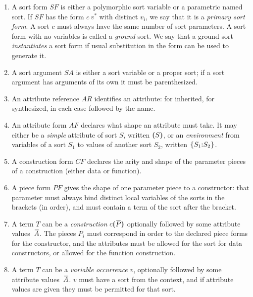 \documentclass[11pt]{article} %
\begin{document}
\begin{enumerate}
\item\label{note:sf}\label{note:primary} A sort form $SF$ is either a polymorphic sort variable or a
  parametric named sort. If $SF$ has the form $c~v^*$ with distinct $v_i$, we say that it is a
  \emph{primary sort form}. A sort $c$ must always have the same number of sort parameters. A sort
  form with no variables is called a \emph{ground} sort. We say that a ground sort
  \emph{instantiates} a sort form if usual substitution in the form can be used to generate it.

\item\label{note:sa} A sort argument $SA$ is either a sort variable or a proper sort; if a sort
  argument has arguments of its own it must be parenthesized.

\item\label{note:ar} An attribute reference $AR$ identifies an attribute:  for inherited,
   for synthesized, in each case followed by the name.

\item\label{note:af} An attribute form $AF$ declares what shape an attribute must take. It may
  either be a \emph{simple} attribute of sort $S$, written $\kw(S\kw)$, or an \emph{environment}
  from variables of a sort $S_1$ to values of another sort $S_2$, written $\kw\{S_1\kw:S_2\kw\}$.

\item\label{note:cf} A construction form $CF$ declares the arity and shape of the parameter pieces of a
  construction (either data or function).

\item\label{note:pf} A piece form $PF$ gives the shape of one parameter piece to a constructor: that
  parameter must always bind distinct local variables of the sorts in the brackets (in order), and
  must contain a term of the sort after the bracket.

\item\label{note:t-cons} A term $T$ can be a \emph{construction} $c\kw(\ov{P}\kw)$ optionally
  followed by some attribute values~$\ov{A}$. The pieces $P_i$ must correspond in order to the
  declared piece forms for the constructor, and the attributes must be allowed for the sort for data
  constructors, or allowed for the function construction.

\item\label{note:t-var} A term $T$ can be a \emph{variable occurrence} $v$, optionally followed by
  some attribute values~$\ov{A}$. $v$ must have a sort from the context, and if attribute values are
  given they must be permitted for that sort.


\end{enumerate}
\end{document}
